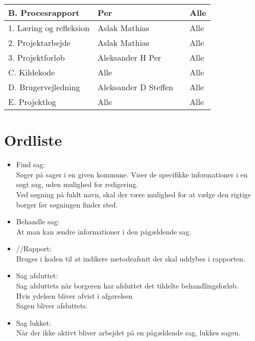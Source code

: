 \begin{center}
\begin{longtable}{|m{5.8cm}|m{3.5cm}|m{3.5cm}|m{3.2cm}|}
B. Procesrapport & Per & & Alle\\ \hline
1. Læring og refleksion & Aslak \newline Mathias & & Alle\\ \hline
2. Projektarbejde &  Aslak \newline Mathias & & Alle\\ \hline
3. Projektforløb & Aleksander H \newline Per & & Alle\\ \hline

C. Kildekode & Alle & & Alle\\ \hline

D. Brugervejledning & Aleksander D \newline Steffen & & Alle\\ \hline

E. Projektlog & Alle & & Alle\\ \hline


\end{longtable}
\end{center}

\section{Ordliste}

\begin{itemize}
\renewcommand\labelitemi{--}
\item Find sag: \\
Søger på sager i en given kommune. Viser de specifikke informationer i en søgt sag, uden mulighed for redigering. \\
Ved søgning på fuldt navn, skal der være mulighed for at vælge den rigtige borger før søgningen finder sted.
\item Behandle sag: \\
At man kan ændre informationer i den pågældende sag.
\item //Rapport: \\
Bruges i koden til at indikere metodeafsnit der skal uddybes i rapporten.
\item Sag afsluttet: \\
Sag afsluttets når borgeren har afsluttet det tildelte behandlingsforløb. \\
Hvis ydelsen bliver afvist i afgørelsen \\
Sagen bliver afsluttets.
\item Sag lukket: \\
Når der ikke aktivt bliver arbejdet på en pågældende sag, lukkes sagen.
\end{itemize}

